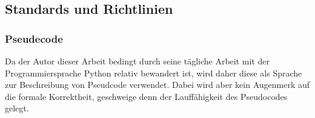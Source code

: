 \subsection{Standards und Richtlinien}
\label{subsec:standards_guidelines}

\subsubsection{Pseudecode}
\label{ssubsec:standards_guidelines:psuedocode}

Da der Autor dieser Arbeit bedingt durch seine tägliche Arbeit mit der
Programmiersprache Python relativ bewandert ist, wird daher diese als
Sprache zur Beschreibung von Pseudcode verwendet.  Dabei wird aber kein
Augenmerk auf die formale Korrektheit, geschweige denn der Lauffähigkeit
des Pseudocodes gelegt.
